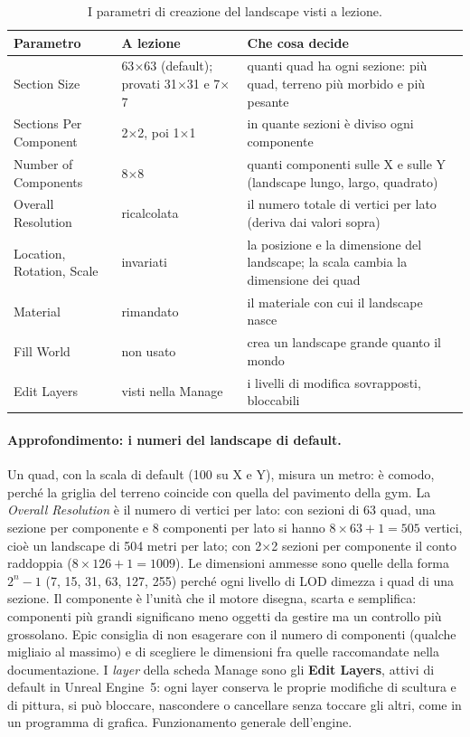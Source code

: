 \begin{table}[htbp]
\centering
\small
\begin{tabular}{@{}p{4.2cm}p{3.0cm}p{6.8cm}@{}}
\toprule
\textbf{Parametro} & \textbf{A lezione} & \textbf{Che cosa decide} \\
\midrule
Section Size & 63$\times$63 (default); provati 31$\times$31 e 7$\times$7 & quanti quad ha
ogni sezione: più quad, terreno più morbido e più pesante \\
Sections Per Component & 2$\times$2, poi 1$\times$1 & in quante sezioni è diviso ogni
componente \\
Number of Components & 8$\times$8 & quanti componenti sulle X e sulle Y (landscape lungo,
largo, quadrato) \\
Overall Resolution & ricalcolata & il numero totale di vertici per lato (deriva dai valori
sopra) \\
Location, Rotation, Scale & invariati & la posizione e la dimensione del landscape; la scala
cambia la dimensione dei quad \\
Material & rimandato & il materiale con cui il landscape nasce \\
Fill World & non usato & crea un landscape grande quanto il mondo \\
Edit Layers & visti nella Manage & i livelli di modifica sovrapposti, bloccabili \\
\bottomrule
\end{tabular}
\caption{I parametri di creazione del landscape visti a lezione.}
\label{ue14:tab:creazione}
\end{table}

\paragraph{Approfondimento: i numeri del landscape di default.} Un quad, con la scala di
default (100 su X e Y), misura un metro: è comodo, perché la griglia del terreno coincide
con quella del pavimento della gym. La \emph{Overall Resolution} è il numero di vertici per
lato: con sezioni di 63 quad, una sezione per componente e 8 componenti per lato si hanno
$8 \times 63 + 1 = 505$ vertici, cioè un landscape di 504 metri per lato; con 2$\times$2
sezioni per componente il conto raddoppia ($8 \times 126 + 1 = 1009$). Le dimensioni
ammesse sono quelle della forma $2^n-1$ (7, 15, 31, 63, 127, 255) perché ogni livello di
LOD dimezza i quad di una sezione. Il componente è l'unità che il motore disegna, scarta e
semplifica: componenti più grandi significano meno oggetti da gestire ma un controllo più
grossolano. Epic consiglia di non esagerare con il numero di componenti (qualche migliaio
al massimo) e di scegliere le dimensioni fra quelle raccomandate nella documentazione. I
\emph{layer} della scheda Manage sono gli \textbf{Edit Layers}, attivi di default in
Unreal Engine~5: ogni layer conserva le proprie modifiche di scultura e di pittura, si può
bloccare, nascondere o cancellare senza toccare gli altri, come in un programma di grafica.
Funzionamento generale dell'engine.

